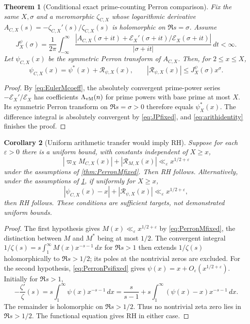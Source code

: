 \documentclass[11pt,reqno]{amsart}
\numberwithin{equation}{section}
\newtheorem{theorem}{Theorem}[section]
\newtheorem{corollary}[theorem]{Corollary}
\begin{document}
\begin{theorem}[Conditional exact prime-counting Perron comparison]
\label{thm:PerronPsifixed}
Fix the same $X,\sigma$ and a meromorphic $\zeta_{C,X}$
whose logarithmic derivative
$A_{C,X}(s)=-\zeta_{C,X}'(s)/\zeta_{C,X}(s)$ is holomorphic
on $\Re s=\sigma$.  Assume
\begin{equation}\label{eq:JPfixed}
 J_X^{\psi}(\sigma)=\frac1{2\pi}
 \int_{-\infty}^{\infty}
 \frac{|A_{C,X}(\sigma+it)+\mathscr E_X'(\sigma+it)/\mathscr E_X(\sigma+it)|}
 {|\sigma+it|}\,dt<\infty.
\end{equation}
Let $\psi_{C,X}(x)$ be the symmetric Perron transform of
$A_{C,X}$. Then, for $2\le x\le X$,
\begin{equation}\label{eq:PerronPsifixed}
 \boxed{\psi_{C,X}(x)=\psi^*(x)+\mathcal R_{\psi,X}(x),\qquad
 |\mathcal R_{\psi,X}(x)|\le J_X^\psi(\sigma)x^\sigma.}
\end{equation}
\end{theorem}
\begin{proof}
By \eqref{eq:EulerMcoeff}, the absolutely convergent prime-power
series $-\mathscr E_X'/\mathscr E_X$ has coefficients $\Lambda_{\rm vM}(n)$ for prime
powers with base prime at most $X$. Its symmetric Perron transform
on $\Re s=\sigma>0$ therefore equals $\psi_X^*(x)$.
The difference integral is absolutely convergent by
\eqref{eq:JPfixed}, and \eqref{eq:arithidentity} finishes the proof.
\end{proof}

\begin{corollary}[Uniform arithmetic transfer would imply RH]
\label{cor:bothtransfersRH}
Suppose for each $\varepsilon>0$ there is a uniform bound, with
constants independent of $X\ge x$,
\[
 |\varpi_X M_{C,X}(x)|+|\mathcal R_{M,X}(x)|
 \ll_\varepsilon x^{1/2+\varepsilon}
\]
under the assumptions of \cref{thm:PerronMfixed}. Then RH follows.
Alternatively, under the assumptions of \cref{thm:PerronPsifixed},
if uniformly for $X\ge x$,
\[
 |\psi_{C,X}(x)-x|+|\mathcal R_{\psi,X}(x)|
 \ll_\varepsilon x^{1/2+\varepsilon},
\]
then RH follows.  These conditions are sufficient \emph{targets},
not demonstrated uniform bounds.
\end{corollary}
\begin{proof}
The first hypothesis gives $M(x)\ll_\varepsilon x^{1/2+\varepsilon}$
by \eqref{eq:PerronMfixed}, the distinction between $M$ and $M^*$
being at most $1/2$.  The convergent integral
$1/\zeta(s)=s\int_1^\infty M(x)x^{-s-1}\,dx$ for $\Re s>1$
then extends $1/\zeta(s)$ holomorphically to
$\Re s>1/2$; its poles at the nontrivial zeros are excluded.
For the second hypothesis, \eqref{eq:PerronPsifixed} gives
$\psi(x)=x+O_\varepsilon(x^{1/2+\varepsilon})$.
Initially for $\Re s>1$,
\[
 -\frac{\zeta'}{\zeta}(s)
 =s\int_1^\infty\psi(x)x^{-s-1}\,dx
 =\frac{s}{s-1}+s\int_1^\infty(\psi(x)-x)x^{-s-1}\,dx.
\]
The remainder is holomorphic on $\Re s>1/2$.
Thus no nontrivial zeta zero lies in $\Re s>1/2$.
The functional equation gives RH in either case.
\end{proof}
\end{document}
